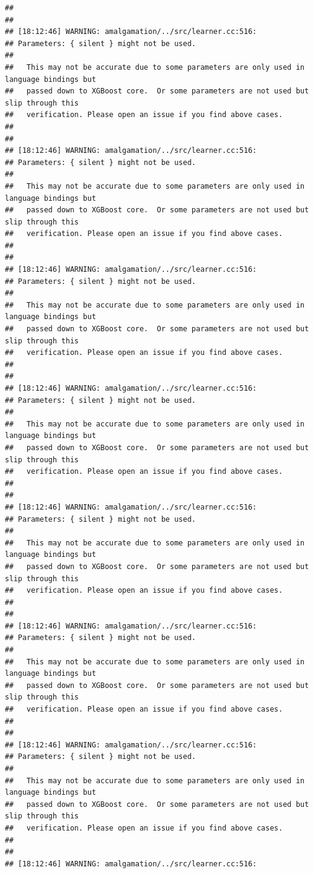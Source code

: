 \documentclass[AMS,STIX2COL]{WileyNJD-v2}\usepackage[]{graphicx}\usepackage[]{color}
\makeatletter
\newenvironment{kframe}{%
 \def\at@end@of@kframe{}%
 \ifinner\ifhmode%
  \def\at@end@of@kframe{\end{minipage}}%
  \begin{minipage}{\columnwidth}%
 \fi\fi%
 \def\FrameCommand##1{\hskip\@totalleftmargin \hskip-\fboxsep
 \colorbox{shadecolor}{##1}\hskip-\fboxsep
     \hskip-\linewidth \hskip-\@totalleftmargin \hskip\columnwidth}%
 \MakeFramed {\advance\hsize-\width
   \@totalleftmargin\z@ \linewidth\hsize
   \@setminipage}}%
 {\par\unskip\endMakeFramed%
 \at@end@of@kframe}
\newenvironment{knitrout}{}{} %
\makeatother
\begin{document}
\begin{knitrout}
\begin{kframe}
\begin{verbatim}
## 
## 
## [18:12:46] WARNING: amalgamation/../src/learner.cc:516: 
## Parameters: { silent } might not be used.
## 
##   This may not be accurate due to some parameters are only used in language bindings but
##   passed down to XGBoost core.  Or some parameters are not used but slip through this
##   verification. Please open an issue if you find above cases.
## 
## 
## [18:12:46] WARNING: amalgamation/../src/learner.cc:516: 
## Parameters: { silent } might not be used.
## 
##   This may not be accurate due to some parameters are only used in language bindings but
##   passed down to XGBoost core.  Or some parameters are not used but slip through this
##   verification. Please open an issue if you find above cases.
## 
## 
## [18:12:46] WARNING: amalgamation/../src/learner.cc:516: 
## Parameters: { silent } might not be used.
## 
##   This may not be accurate due to some parameters are only used in language bindings but
##   passed down to XGBoost core.  Or some parameters are not used but slip through this
##   verification. Please open an issue if you find above cases.
## 
## 
## [18:12:46] WARNING: amalgamation/../src/learner.cc:516: 
## Parameters: { silent } might not be used.
## 
##   This may not be accurate due to some parameters are only used in language bindings but
##   passed down to XGBoost core.  Or some parameters are not used but slip through this
##   verification. Please open an issue if you find above cases.
## 
## 
## [18:12:46] WARNING: amalgamation/../src/learner.cc:516: 
## Parameters: { silent } might not be used.
## 
##   This may not be accurate due to some parameters are only used in language bindings but
##   passed down to XGBoost core.  Or some parameters are not used but slip through this
##   verification. Please open an issue if you find above cases.
## 
## 
## [18:12:46] WARNING: amalgamation/../src/learner.cc:516: 
## Parameters: { silent } might not be used.
## 
##   This may not be accurate due to some parameters are only used in language bindings but
##   passed down to XGBoost core.  Or some parameters are not used but slip through this
##   verification. Please open an issue if you find above cases.
## 
## 
## [18:12:46] WARNING: amalgamation/../src/learner.cc:516: 
## Parameters: { silent } might not be used.
## 
##   This may not be accurate due to some parameters are only used in language bindings but
##   passed down to XGBoost core.  Or some parameters are not used but slip through this
##   verification. Please open an issue if you find above cases.
## 
## 
## [18:12:46] WARNING: amalgamation/../src/learner.cc:516: 

\end{verbatim}
\end{kframe}
\end{knitrout}
\end{document}
